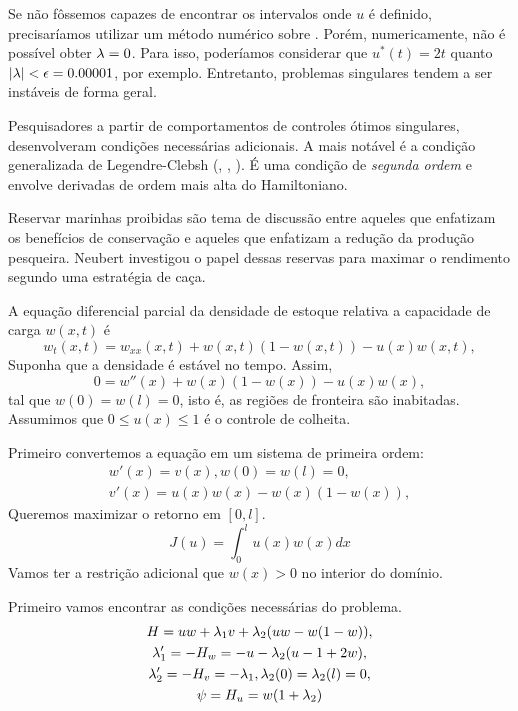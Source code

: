Se não fôssemos capazes de encontrar os intervalos onde $u$ é definido,
precisaríamos utilizar um método numérico sobre . Porém,
numericamente, não é possível obter $\lambda = 0$. Para isso, poderíamos
considerar que $u^*(t) = 2t$ quanto $|\lambda| < \epsilon = 0.00001$, por exemplo.
Entretanto, problemas singulares tendem a ser instáveis de forma geral. 

Pesquisadores a partir de comportamentos de controles ótimos singulares,
desenvolveram condições necessárias adicionais. A mais notável é a condição
generalizada de Legendre-Clebsh (\cite{Tsypkin1970AppliedOC}, \cite{Grossmann1984}, \cite{krener1977}). É uma condição de \textit{segunda ordem} e
envolve derivadas de ordem mais alta do Hamiltoniano. 

\begin{example}
    Reservar marinhas proibidas são tema de discussão entre aqueles que
    enfatizam os benefícios de conservação e aqueles que enfatizam a redução
    da produção pesqueira. Neubert investigou o papel dessas reservas para
    maximar o rendimento segundo uma estratégia de caça. 

    A equação diferencial parcial da densidade de estoque relativa a
    capacidade de carga $w(x,t)$ é 
    $$ 
    w_t(x,t) = w_{xx}(x,t) + w(x,t)(1 - w(x,t)) - u(x)w(x,t),
    $$
    Suponha que a densidade é estável no tempo. Assim, 
    $$
    0 = w''(x) + w(x)(1 - w(x)) - u(x)w(x),
    $$
    tal que $w(0) = w(l) = 0$, isto é, as regiões de fronteira são inabitadas.
    Assumimos que $0 \le u(x) \le 1$ é o controle de colheita. 

    Primeiro convertemos a equação em um sistema de primeira ordem:
    \begin{gather*}
        w'(x) = v(x), w(0) = w(l) = 0, \\
        v'(x) = u(x)w(x) - w(x)(1 - w(x)), 
    \end{gather*}
    Queremos maximizar o retorno em $[0,l]$.
    $$
    J(u) = \int_0^l u(x)w(x) dx
    $$
    Vamos ter a restrição adicional que $w(x) > 0$ no interior do domínio. 
\end{example}

Primeiro vamos encontrar as condições necessárias do problema. 
\begin{gather*}
    H = uw + \lambda_1 v + \lambda_2(uw - w(1 - w)), \\
    \lambda_1 ' = -H_w = -u - \lambda_2(u - 1 + 2w), \\
    \lambda_2 ' = -H_v = - \lambda_1, \lambda_2(0) = \lambda_2(l) = 0, \\
    \psi = H_u = w(1 + \lambda_2)
\end{gather*}

